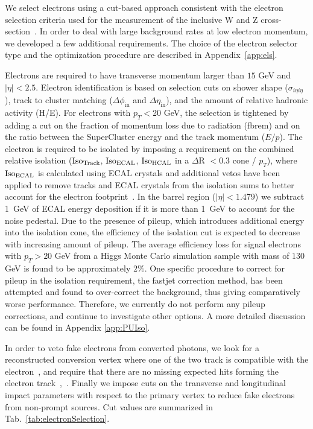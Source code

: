 We select electrons using a cut-based approach consistent with the electron 
selection criteria used for the measurement of the inclusive W and Z 
cross-section~\cite{VBTFCrossSectionNote}. In order to deal with large 
background rates at low electron momentum, we developed a few additional 
requirements. The choice of the electron selector type and the optimization procedure
are described in Appendix~\ref{app:els}.

Electrons are required to have transverse momentum larger than $15$ GeV and $|\eta| < 2.5$. 
Electron identification is based on selection cuts on shower shape ($\sigma_{i\eta i\eta}$), 
track to cluster matching ($\Delta \phi_{\mathrm{in}}$ and $\Delta \eta_{\mathrm{in}}$), and the amount 
of relative hadronic activity (H/E). 
For electrons with $p_T<$20 GeV, the selection is tightened by adding a cut on the fraction of momentum 
loss due to radiation (fbrem) and on the ratio between the SuperCluster energy and the track momentum ($E/p$).
The electron is required to be isolated by imposing a requirement on the combined relative isolation 
($\rm{Iso}_{Track}$, $\rm{Iso}_{ECAL}$, $\rm{Iso}_{HCAL}$ in a $\Delta$R $< 0.3$ cone / $p_{T}$), 
where $\rm{Iso}_{ECAL}$ is calculated using ECAL crystals and additional vetos have been 
applied to remove tracks and ECAL crystals from the isolation sums to better account for 
the electron footprint~\cite{ElIso}. In the barrel region ($|\eta| < 1.479$) we subtract 1~GeV of 
ECAL energy deposition if it is more than 1~GeV to account for the noise pedestal. 
Due to the presence of pileup, which introduces additional energy into 
the isolation cone, the efficiency of the isolation cut is expected
to decrease with increasing amount of pileup. The average efficiency loss for signal electrons 
with $p_{T} > 20$ GeV from a Higgs Monte Carlo simulation sample with mass of $130$ GeV is 
found to be approximately $2\%$. One specific procedure to correct for pileup in the
isolation requirement, the fastjet correction method, has been attempted and found to
over-correct the background, thus giving comparatively worse performance. Therefore,
we currently do not perform any pileup corrections, and continue to investigate other
options. A more detailed discussion can be found in Appendix \ref{app:PUIso}.

In order to veto fake electrons from converted photons, we look for a reconstructed conversion vertex where 
one of the two track is compatible with the electron~\cite{ConversionNote}, 
and require that there are no missing expected hits forming the electron track~\cite{ConversionNote},~\cite{NExpHits}. 
Finally we impose cuts on the transverse and longitudinal impact parameters with
respect to the primary vertex to reduce fake electrons from non-prompt
sources. Cut values are summarized in Tab.~\ref{tab:electronSelection}.

